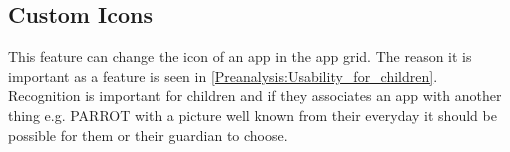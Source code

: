 \subsection{Custom Icons}
\label{backlog:custom_icons}

This feature can change the icon of an app in the app grid. The reason it is important as a feature is seen in \autoref{Preanalysis:Usability_for_children}. Recognition is important for children and if they associates an app with another thing e.g. PARROT with a picture well known from their everyday it should be possible for them or their guardian to choose.